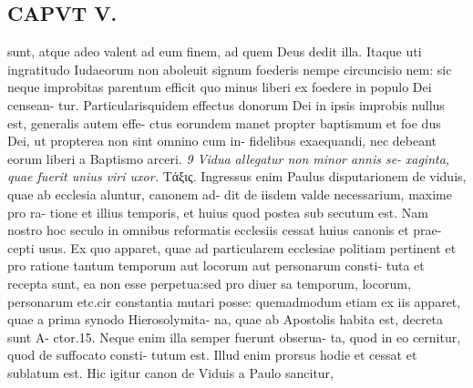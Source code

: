 \documentclass{article}
\begin{document}
\begin{pages}
\section*{CAPVT  V. }
\marginpar{[ p.269 ]}sunt, atque adeo valent ad eum finem, ad quem Deus dedit illa. Itaque uti ingratitudo Iudaeorum non aboleuit signum foederis nempe circuncisio nem: sic neque improbitas parentum efficit quo minus liberi ex foedere in populo Dei censean- tur. Particularisquidem effectus donorum Dei in ipsis improbis nullus est, generalis autem effe- ctus eorundem manet propter baptismum et foe dus Dei, ut propterea non sint omnino cum in- fidelibus exaequandi, nec debeant eorum liberi a Baptismo arceri. \textit{9 Vidua allegatur non minor annis se-} \textit{xaginta, quae fuerit unius viri uxor.} Τάξις. Ingressus enim Paulus disputarionem de viduis, quae ab ecclesia aluntur, canonem ad- dit de iisdem valde necessarium, maxime pro ra- tione et illius temporis, et huius quod postea sub secutum est. Nam nostro hoc seculo in omnibus reformatis ecclesiis cessat huius canonis et prae- cepti usus. Ex quo apparet, quae ad particularem ecclesiae politiam pertinent et pro ratione tantum temporum aut locorum aut personarum consti- tuta et recepta sunt, ea non esse perpetua:sed pro diuer sa temporum, locorum, personarum etc.cir constantia mutari posse: quemadmodum etiam ex iis apparet, quae a prima synodo Hierosolymita- na, quae ab Apostolis habita est, decreta sunt A- ctor.15. Neque enim illa semper fuerunt obserua- ta, quod in eo cernitur, quod de suffocato consti- tutum est. Illud enim prorsus hodie et cessat et sublatum est. Hic igitur canon de Viduis a Paulo sancitur, 

\end{pages}
\end{document}
